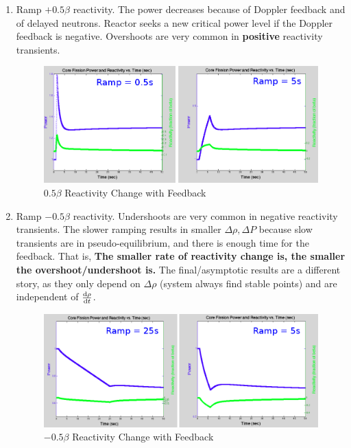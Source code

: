 \documentclass{school-22.211-notes}
\begin{document}
\clearpage
{}
\begin{enumerate}
\item Ramp $+0.5\beta$ reactivity. The power decreases because of Doppler feedback and of delayed neutrons. Reactor seeks a new critical power level if the Doppler feedback is negative. Overshoots are very common in \textbf{positive} reactivity transients. 

\begin{figure}[ht]
  \centering
  \includegraphics[width=6in]{images/pke/fn5.png}
  \caption{$0.5 \beta$ Reactivity Change with Feedback}
\end{figure}

\item Ramp $-0.5\beta$ reactivity. Undershoots are very common in negative reactivity transients. The slower ramping results in smaller $\Delta \rho, \Delta P$ because slow transients are in pseudo-equilibrium, and there is enough time for the feedback. That is, \textbf{The smaller rate of reactivity change is, the smaller the overshoot/undershoot is.} The final/asymptotic results are a different story, as they only depend on $\Delta \rho$ (system always find stable points) and are independent of $\frac{\mathrm{d}\rho}{\mathrm{d}t}$. 

\begin{figure}[ht]
  \centering
  \includegraphics[width=6in]{images/pke/fn6.png}
  \caption{$-0.5 \beta$ Reactivity Change with Feedback}
\end{figure}


\end{enumerate}
\end{document}
